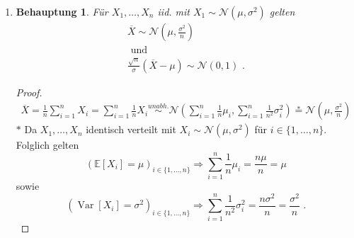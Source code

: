 \documentclass[a4paper]{scrartcl}
\newtheorem*{behaupt}{Behauptung}
\newcommand{\e}{\mathbb{E}}
\newcommand{\var}{\operatorname{Var}}
\def \blattnr {7}
\begin{document}
\begin{enumerate}[label=\bfseries \blattnr.\arabic*]
\begin{enumerate}
        \item 
            \begin{behaupt}
                Für $X_1, \dotsc, X_n$ iid. mit $X_1 \sim \mathcal{N}(\mu,
                \sigma^2)$ gelten
                \begin{gather*}
                    \overline{X} \sim
                    \mathcal{N}\left(\mu, \frac{\sigma^2}{n} \right) \\
                    \text{ und } \\
                    \frac{\sqrt{n}}{\sigma} (\overline{X} - \mu) \sim
                    \mathcal{N}(0, 1)
                    \text{ .}
                \end{gather*}
            \end{behaupt}
            \begin{proof}
                \begin{equation*}
                    \begin{split}
                        \overline{X} 
                        = \frac1n \sum_{i=1}^n X_i 
                        = \sum_{i=1}^n \frac1n X_i 
                        \stackrel{unabh.}{\sim} \mathcal{N}\left( \sum_{i=1}^n \frac1n \mu_i, \sum_{i=1}^n \frac1{n^2} \sigma_i^2 \right)
                        \stackrel{\ast}{=} \mathcal{N}\left( \mu, \frac{\sigma^2}{n} \right)
                    \end{split}
                \end{equation*}
                $\ast$ Da $X_1, \dotsc, X_n$ identisch verteilt mit $X_i \sim
                \mathcal{N}(\mu, \sigma^2)$ für $i \in \{1,\dotsc, n\}$.
                Folglich gelten
                \begin{equation*}
                    (\e[X_i]=\mu)_{i \in \{1,\dotsc, n\}}
                    \Rightarrow
                    \sum_{i=1}^n \frac1n \mu_i = \frac{n\mu}n = \mu
                \end{equation*}
                sowie
                \begin{equation*}
                    (\var[X_i] = \sigma^2)_{i \in \{1,\dotsc, n\}}
                    \Rightarrow
                    \sum_{i=1}^n \frac1{n^2} \sigma_i^2
                    = \frac{n\sigma^2}n = \frac{\sigma^2}n
                    \text{ .}
                \end{equation*}


\end{proof}
\end{enumerate}
\end{enumerate}
\end{document}
